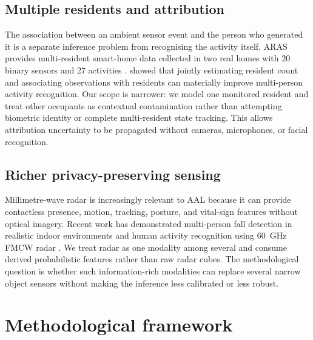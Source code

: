 \documentclass[11pt]{article}
\begin{document}
\subsection{Multiple residents and attribution}

The association between an ambient sensor event and the person who generated it is a separate inference problem from recognising the activity itself. ARAS provides multi-resident smart-home data collected in two real homes with 20 binary sensors and 27 activities \citep{alemdar2013aras}. \citet{wang2022multiperson} showed that jointly estimating resident count and associating observations with residents can materially improve multi-person activity recognition. Our scope is narrower: we model one monitored resident and treat other occupants as contextual contamination rather than attempting biometric identity or complete multi-resident state tracking. This allows attribution uncertainty to be propagated without cameras, microphones, or facial recognition.

\subsection{Richer privacy-preserving sensing}

Millimetre-wave radar is increasingly relevant to AAL because it can provide contactless presence, motion, tracking, posture, and vital-sign features without optical imagery. Recent work has demonstrated multi-person fall detection in realistic indoor environments \citep{chen2026mmwave} and human activity recognition using 60~GHz FMCW radar \citep{samimi2026fmcw}. We treat radar as one modality among several and consume derived probabilistic features rather than raw radar cubes. The methodological question is whether such information-rich modalities can replace several narrow object sensors without making the inference less calibrated or less robust.

\section{Methodological framework}
\label{sec:method}
\end{document}
